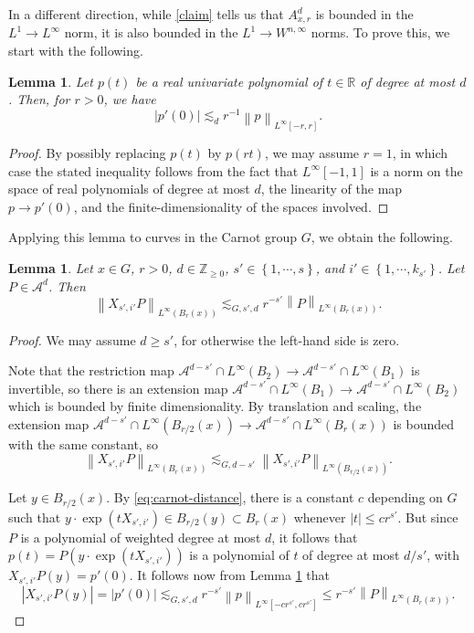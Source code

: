 \documentclass[11pt,reqno]{amsart}
\newtheorem{lemma}[theorem]{Lemma}
\newcommand{\1}{\mathbf 1}
\begin{document}
In a different direction, while \eqref{claim} tells us that $A^d_{x,r}$ is bounded in the $L^1\to L^\infty$ norm, it is also bounded in the $L^1\to W^{n,\infty}$ norms. To prove this, we start with the following.
\begin{lemma}\label{lem:poly-elem}
    Let $p\left(t\right)$ be a real univariate polynomial of $t\in \mathbb{R}$ of degree at most $d$. Then, for $r>0$, we have
    \[
    \left|p'\left(0\right)\right|\lesssim_d r^{-1}\left\|p\right\|_{L^\infty\left[-r,r\right]}.
    \]
\end{lemma}
\begin{proof}
    By possibly replacing $p\left(t\right)$ by $p\left(rt\right)$, we may assume $r=1$, in which case the stated inequality follows from the fact that $L^\infty \left[-1,1\right]$ is a norm on the space of real polynomials of degree at most $d$, the linearity of the map $p\to p'\left(0\right)$, and the finite-dimensionality of the spaces involved.
\end{proof}
Applying this lemma to curves in the Carnot group $G$, we obtain the following.
\begin{lemma}\label{lem:diffpoly}
    Let $x\in G$, $r>0$, $d\in \mathbb{Z}_{\ge 0}$, $s'\in \left\{1,\cdots,s\right\}$, and $i'\in \left\{1,\cdots,k_{s'}\right\}$. Let $P\in \mathcal{A}^d$. Then
    \[
    \left\|X_{s',i'}P\right\|_{L^\infty\left(B_r\left(x\right)\right)}\lesssim_{G,s',d} r^{-s'}\left\|P\right\|_{L^\infty\left(B_r\left(x\right)\right)}.
    \]
\end{lemma}
\begin{proof}
    We may assume $d\ge s'$, for otherwise the left-hand side is zero.
    
    Note that the restriction map $\mathcal{A}^{d-s'}\cap L^\infty\left(B_2\right)\to \mathcal{A}^{d-s'}\cap L^\infty\left(B_1\right)$ is invertible, so there is an extension map $\mathcal{A}^{d-s'}\cap L^\infty\left(B_1\right)\to \mathcal{A}^{d-s'}\cap L^\infty\left(B_2\right)$ which is bounded by finite dimensionality. By translation and scaling, the extension map $\mathcal{A}^{d-s'}\cap L^\infty\left(B_{r/2}\left(x\right)\right)\to \mathcal{A}^{d-s'}\cap L^\infty\left(B_r\left(x\right)\right)$ is bounded with the same constant, so
    \[
    \left\|X_{s',i'}P\right\|_{L^\infty\left(B_r\left(x\right)\right)}\lesssim_{G,d-s'} \left\|X_{s',i'}P\right\|_{L^\infty\left(B_{r/2}\left(x\right)\right)}.
    \]

    Let $y\in B_{r/2}\left(x\right)$. By \eqref{eq:carnot-distance}, there is a constant $c$ depending on $G$ such that $y\cdot \exp\left(tX_{s',i'}\right)\in B_{r/2}\left(y\right)\subset B_r\left(x\right)$ whenever $\left|t\right|\le cr^{s'}$. But since $P$ is a polynomial of weighted degree at most $d$, it follows that $p\left(t\right)= P\left(y\cdot \exp\left(tX_{s',i'}\right)\right)$ is a polynomial of $t$ of degree at most $d/s'$, with $X_{s',i'}P\left(y\right)=p'\left(0\right)$. It follows now from Lemma \ref{lem:poly-elem} that
    \[
    \left|X_{s',i'}P\left(y\right)\right|=\left|p'\left(0\right)\right|\lesssim_{G,s',d} r^{-s'}\left\|p\right\|_{L^\infty\left[-cr^{s'},cr^{s'}\right]}\le r^{-s'}\left\|P\right\|_{L^\infty\left(B_r\left(x\right)\right)}.
    \]
\end{proof}
\end{document}
